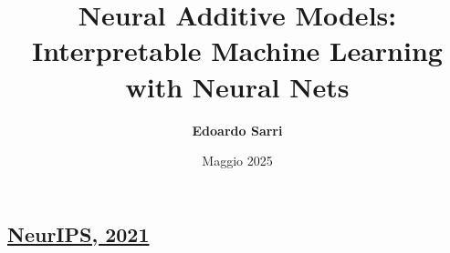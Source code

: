 \title{Neural Additive Models: Interpretable Machine Learning with Neural Nets}
\subsection{\href{https://neural-additive-models.github.io}{NeurIPS, 2021}}
\author[Edoardo Sarri]{\textbf{Edoardo Sarri}}
\date{Maggio 2025}
